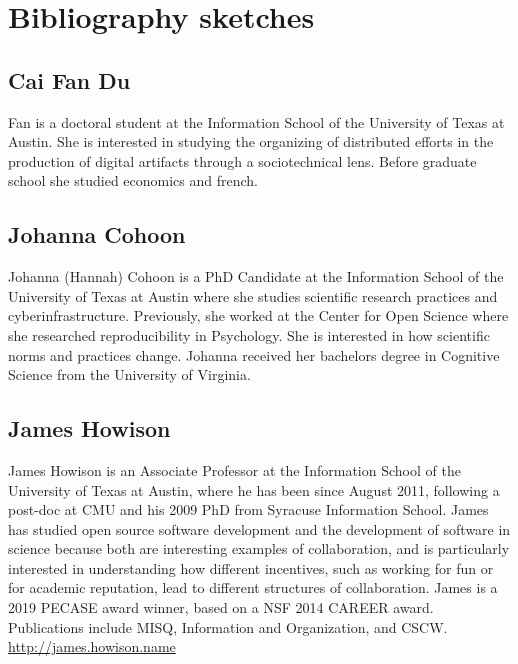 \documentclass[sigchi-a,screen]{acmart}
\begin{document}



\appendix

\section{Bibliography sketches}

\subsection{Cai Fan Du}
Fan is a doctoral student at the Information School of the University of Texas at Austin. She is interested in studying the organizing of distributed efforts in the production of digital artifacts through a sociotechnical lens. Before graduate school she studied economics and french.

\subsection{Johanna Cohoon}
Johanna (Hannah) Cohoon is a PhD Candidate at the Information School of the University of Texas at Austin where she studies scientific research practices and cyberinfrastructure. Previously, she worked at the Center for Open Science where she researched reproducibility in Psychology. She is interested in how scientific norms and practices change. Johanna received her bachelors degree in Cognitive Science from the University of Virginia. 

\subsection{James Howison}

James Howison is an Associate Professor at the Information School of the University of Texas at Austin, where he has been since August 2011, following a post-doc at CMU and his 2009 PhD from Syracuse Information School. James has studied open source software development and the development of software in science because both are interesting examples of collaboration, and is particularly interested in understanding how different incentives, such as working for fun or for academic reputation, lead to different structures of collaboration. James is a 2019 PECASE award winner, based on a NSF 2014 CAREER award. Publications include MISQ, Information and Organization, and CSCW. \href{http://james.howison.name}{http://james.howison.name}
\end{document}
